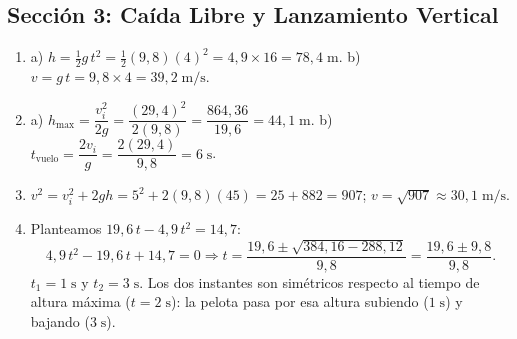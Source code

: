 \documentclass[12pt, letterpaper]{article}
\begin{document}
  \newpage

  \subsection*{Sección 3: Caída Libre y Lanzamiento Vertical}

  \begin{enumerate}[leftmargin=*, label=\textbf{\arabic*.}]
    \item a) $h = \tfrac{1}{2}g\,t^2 = \tfrac{1}{2}(9{,}8)(4)^2 = 4{,}9 \times 16 = 78{,}4\;\text{m}$.
          \quad b) $v = g\,t = 9{,}8 \times 4 = 39{,}2\;\text{m/s}$.

    \item a) $h_{\max} = \dfrac{v_i^2}{2g} = \dfrac{(29{,}4)^2}{2(9{,}8)} = \dfrac{864{,}36}{19{,}6} = 44{,}1\;\text{m}$.
          \quad b) $t_{\text{vuelo}} = \dfrac{2v_i}{g} = \dfrac{2(29{,}4)}{9{,}8} = 6\;\text{s}$.

    \item $v^2 = v_i^2 + 2gh = 5^2 + 2(9{,}8)(45) = 25 + 882 = 907$; \quad $v = \sqrt{907} \approx 30{,}1\;\text{m/s}$.

    \item Planteamos $19{,}6\,t - 4{,}9\,t^2 = 14{,}7$:
          \[
            4{,}9\,t^2 - 19{,}6\,t + 14{,}7 = 0 \Rightarrow t = \frac{19{,}6 \pm \sqrt{384{,}16 - 288{,}12}}{9{,}8} = \frac{19{,}6 \pm 9{,}8}{9{,}8}.
          \]
          $t_1 = 1\;\text{s}$ y $t_2 = 3\;\text{s}$.
          Los dos instantes son simétricos respecto al tiempo de altura máxima ($t = 2\;\text{s}$): la pelota pasa por esa altura subiendo ($1\;\text{s}$) y bajando ($3\;\text{s}$).
  \end{enumerate}

\fi
\end{document}
